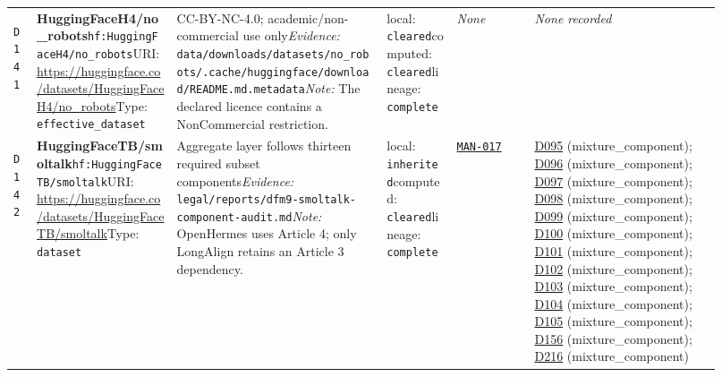 \documentclass[9pt,a4paper]{article}
\newcommand{\depid}[1]{\hypertarget{dep:#1}{\texttt{#1}}}
\begin{document}
\begin{landscape}
\begin{longtable}{@{}L{0.035\linewidth}L{0.185\linewidth}L{0.27\linewidth}L{0.09\linewidth}L{0.10\linewidth}L{0.24\linewidth}@{}}
\depid{D141} & \textbf{HuggingFaceH4/no\_robots}\newline \nolinkurl{hf:HuggingFaceH4/no_robots}\newline URI: \url{https://huggingface.co/datasets/HuggingFaceH4/no_robots}\newline Type: \texttt{effective\_dataset} & CC-BY-NC-4.0; academic/non-commercial use only\newline \textit{Evidence:} \nolinkurl{data/downloads/datasets/no_robots/.cache/huggingface/download/README.md.metadata}\newline \textit{Note:} The declared licence contains a NonCommercial restriction. & local: \texttt{cleared}\newline computed: \texttt{cleared}\newline lineage: \texttt{complete} & \textit{None} & \textit{None recorded} \\
\depid{D142} & \textbf{HuggingFaceTB/smoltalk}\newline \nolinkurl{hf:HuggingFaceTB/smoltalk}\newline URI: \url{https://huggingface.co/datasets/HuggingFaceTB/smoltalk}\newline Type: \texttt{dataset} & Aggregate layer follows thirteen required subset components\newline \textit{Evidence:} \nolinkurl{legal/reports/dfm9-smoltalk-component-audit.md}\newline \textit{Note:} OpenHermes uses Article 4; only LongAlign retains an Article 3 dependency. & local: \texttt{inherited}\newline computed: \texttt{cleared}\newline lineage: \texttt{complete} & \hyperlink{manual:MAN-017}{\texttt{MAN-017}} & \hyperlink{dep:D095}{D095} (mixture\_component); \hyperlink{dep:D096}{D096} (mixture\_component); \hyperlink{dep:D097}{D097} (mixture\_component); \hyperlink{dep:D098}{D098} (mixture\_component); \hyperlink{dep:D099}{D099} (mixture\_component); \hyperlink{dep:D100}{D100} (mixture\_component); \hyperlink{dep:D101}{D101} (mixture\_component); \hyperlink{dep:D102}{D102} (mixture\_component); \hyperlink{dep:D103}{D103} (mixture\_component); \hyperlink{dep:D104}{D104} (mixture\_component); \hyperlink{dep:D105}{D105} (mixture\_component); \hyperlink{dep:D156}{D156} (mixture\_component); \hyperlink{dep:D216}{D216} (mixture\_component) \\

\end{longtable}
\end{landscape}
\end{document}
